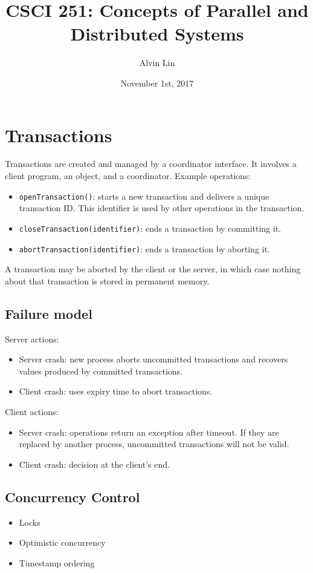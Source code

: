 \documentclass{math}
\title{CSCI 251: Concepts of Parallel and Distributed Systems}
\author{Alvin Lin}
\date{November 1st, 2017}
\begin{document}
\maketitle

\section*{Transactions}
Transactions are created and managed by a coordinator interface. It involves a
client program, an object, and a coordinator. Example operations:
\begin{itemize}
  \item \texttt{openTransaction()}: starts a new transaction and delivers a
  unique transaction ID. This identifier is used by other operations in the
  transaction.
  \item \texttt{closeTransaction(identifier)}: ends a transaction by
  committing it.
  \item \texttt{abortTransaction(identifier)}: ends a transaction by aborting
  it.
\end{itemize}
A transaction may be aborted by the client or the server, in which case nothing
about that transaction is stored in permanent memory.

\subsection*{Failure model}
Server actions:
\begin{itemize}
  \item Server crash: new process aborts uncommitted transactions and recovers
  values produced by committed transactions.
  \item Client crash: uses expiry time to abort transactions.
\end{itemize}
Client actions:
\begin{itemize}
  \item Server crash: operations return an exception after timeout. If they are
  replaced by another process, uncommitted transactions will not be valid.
  \item Client crash: decision at the client's end.
\end{itemize}

\subsection*{Concurrency Control}
\begin{itemize}
  \item Locks
  \item Optimistic concurrency
  \item Timestamp ordering
\end{itemize}
\end{document}
